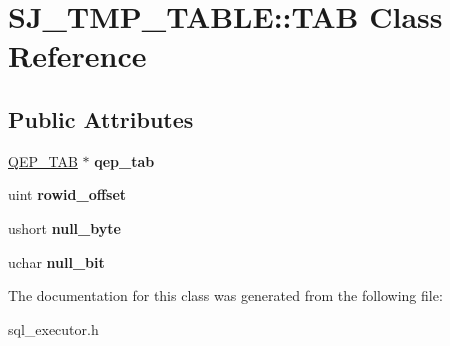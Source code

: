 \hypertarget{classSJ__TMP__TABLE_1_1TAB}{}\section{S\+J\+\_\+\+T\+M\+P\+\_\+\+T\+A\+B\+LE\+:\+:T\+AB Class Reference}
\label{classSJ__TMP__TABLE_1_1TAB}
\subsection*{Public Attributes}
\begin{DoxyCompactItemize}
\item 
\mbox{\label{classSJ__TMP__TABLE_1_1TAB_a01ac4610e87bd0d5c228453832e0803f}} 
\mbox{\hyperlink{classQEP__TAB}{Q\+E\+P\+\_\+\+T\+AB}} $\ast$ {\bfseries qep\+\_\+tab}
\item 
\mbox{\label{classSJ__TMP__TABLE_1_1TAB_ae1332c834265f27883cf4cd97f1f570c}} 
uint {\bfseries rowid\+\_\+offset}
\item 
\mbox{\label{classSJ__TMP__TABLE_1_1TAB_aab3f7f24a6f28bace5e2a43915d9cc66}} 
ushort {\bfseries null\+\_\+byte}
\item 
\mbox{\label{classSJ__TMP__TABLE_1_1TAB_a22d2932c4c9d06f73400d62210aef8b1}} 
uchar {\bfseries null\+\_\+bit}
\end{DoxyCompactItemize}


The documentation for this class was generated from the following file\+:\begin{DoxyCompactItemize}
\item 
sql\+\_\+executor.\+h\end{DoxyCompactItemize}
